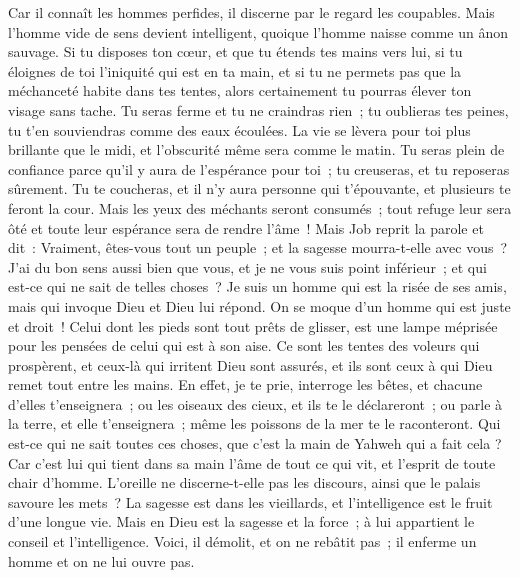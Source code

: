 \begin{multicols}{2}
Car il connaît les hommes perfides, il discerne par le regard les coupables.
Mais l'homme vide de sens devient intelligent, quoique l'homme naisse comme un ânon sauvage.
Si tu disposes ton cœur, et que tu étends tes mains vers lui,
si tu éloignes de toi l'iniquité qui est en ta main, et si tu ne permets pas que la méchanceté habite dans tes tentes, 
alors certainement tu pourras élever ton visage sans tache. Tu seras ferme et tu ne craindras rien~;
tu oublieras tes peines, tu t'en souviendras comme des eaux écoulées.
La vie se lèvera pour toi plus brillante que le midi, et l'obscurité même sera comme le matin.
 Tu seras plein de confiance parce qu'il y aura de l'espérance pour toi~; tu creuseras, et tu reposeras sûrement.
Tu te coucheras, et il n'y aura personne qui t'épouvante, et plusieurs te feront la cour. 
Mais les yeux des méchants seront consumés~; tout refuge leur sera ôté et toute leur espérance sera de rendre l'âme~!
\VerseOne{}Mais Job reprit la parole et dit~:
Vraiment, êtes-vous tout un peuple~; et la sagesse mourra-t-elle avec vous~?
J'ai du bon sens aussi bien que vous, et je ne vous suis point inférieur~; et qui est-ce qui ne sait de telles choses~?
Je suis un homme qui est la risée de ses amis, mais qui invoque Dieu et Dieu lui répond. On se moque d'un homme qui est juste et droit~!
 Celui dont les pieds sont tout prêts de glisser, est une lampe méprisée pour les pensées de celui qui est à son aise. 
Ce sont les tentes des voleurs qui prospèrent, et ceux-là qui irritent Dieu sont assurés, et ils sont ceux à qui Dieu remet tout entre les mains.
En effet, je te prie, interroge les bêtes, et chacune d'elles t'enseignera~; ou les oiseaux des cieux, et ils te le déclareront~;
ou parle à la terre, et elle t'enseignera~; même les poissons de la mer te le raconteront. 
Qui est-ce qui ne sait toutes ces choses, que c'est la main de Yahweh qui a fait cela ? 
Car c'est lui qui tient dans sa main l'âme de tout ce qui vit, et l'esprit de toute chair d'homme. 
L'oreille ne discerne-t-elle pas les discours, ainsi que le palais savoure les mets~?
La sagesse est dans les vieillards, et l'intelligence est le fruit d'une longue vie.
Mais en Dieu est la sagesse et la force~; à lui appartient le conseil et l'intelligence.
Voici, il démolit, et on ne rebâtit pas~; il enferme un homme et on ne lui ouvre pas.

\end{multicols}
